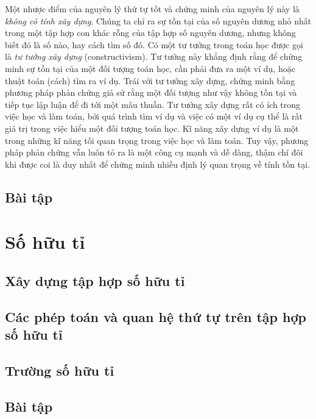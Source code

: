 Một nhược điểm của nguyên lý thứ tự tốt và chứng minh của nguyên lý này là \textit{không có tính xây dựng}. Chúng ta chỉ ra sự tồn tại của số nguyên dương nhỏ nhất trong một tập hợp con khác rỗng của tập hợp số nguyên dương, nhưng không biết đó là số nào, hay cách tìm số đó. Có một tư tưởng trong toán học được gọi là \textit{tư tưởng xây dựng} (constructivism). Tư tưởng này khẳng định rằng để chứng minh sự tồn tại của một đối tượng toán học, cần phải đưa ra một ví dụ, hoặc thuật toán (cách) tìm ra ví dụ. Trái với tư tưởng xây dựng, chứng minh bằng phương pháp phản chứng giả sử rằng một đối tượng như vậy không tồn tại và tiếp tục lập luận để đi tới một mâu thuẫn. Tư tưởng xây dựng rất có ích trong việc học và làm toán, bởi quá trình tìm ví dụ và việc có một ví dụ cụ thể là rất giá trị trong việc hiểu một đối tượng toán học. Kĩ năng xây dựng ví dụ là một trong những kĩ năng tối quan trọng trong việc học và làm toán. Tuy vậy, phương pháp phản chứng vẫn luôn tỏ ra là một công cụ mạnh và dễ dàng, thậm chí đôi khi được coi là duy nhất để chứng minh nhiều định lý quan trọng về tính tồn tại.

\subsection{Bài tập}

\section{Số hữu tỉ}

\subsection{Xây dựng tập hợp số hữu tỉ}

\subsection{Các phép toán và quan hệ thứ tự trên tập hợp số hữu tỉ}

\subsection{Trường số hữu tỉ}

\subsection{Bài tập}
